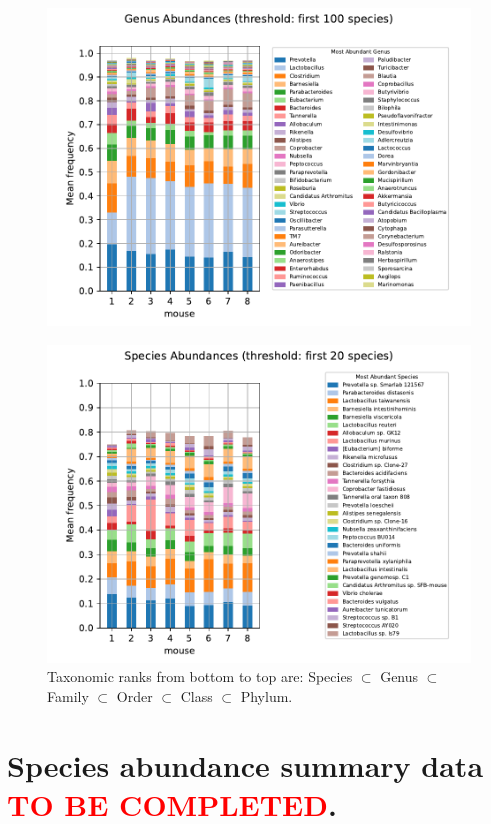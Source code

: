 \begin{figure}[H]
    \centering
\includegraphics[width=0.9\linewidth]{figures/chapter_2/Genus_stacked_first_100.pdf}

    \label{fig:enter-label}
\end{figure}

\begin{figure}[H]\ContinuedFloat
    \centering
\includegraphics[width=0.9\linewidth]{figures/chapter_2/Species_stacked_first_20.pdf}
    \caption{Taxonomic ranks from bottom to top are:
Species $\subset$ Genus $\subset$ Family $\subset$ Order $\subset$ Class $\subset$ Phylum.}
    \label{fig:enter-label}
\end{figure}

\newpage
\section{Species abundance summary data \textcolor{red}{TO BE COMPLETED}.}


